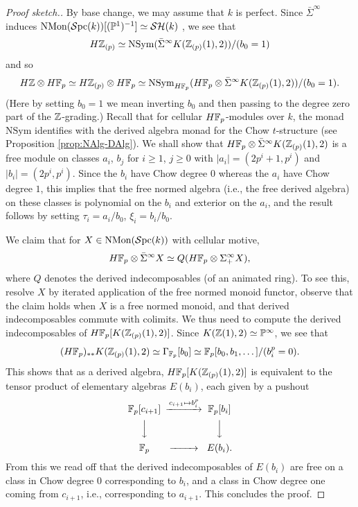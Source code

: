 \documentclass{amsart}
\numberwithin{proposition}{section}
\numberwithin{equation}{section}
\def\NSym{\mathrm{NSym}}
\def\NMon{\mathrm{NMon}}
\begin{document}
\begin{proof}[Proof sketch.]
By base change, we may assume that $k$ is perfect.
Since $\bar\Sigma^\infty$ induces $\NMon(\Spc(k))[(\P^1)^{-1}] \wequi \SH(k)$ \cite[Theorem~1.1]{bachmann-MGM}, we see that \[ H\Z_{(p)} \wequi \NSym(\bar\Sigma^\infty K(\Z_{(p)}(1),2))/(b_0=1) \] and so \[ H\Z \otimes H\F_p \wequi H\Z_{(p)} \otimes H\F_p \wequi \NSym_{H\F_p}(H\F_p \otimes \bar\Sigma^\infty K(\Z_{(p)}(1),2))/(b_0=1). \]
(Here by setting $b_0=1$ we mean inverting $b_0$ and then passing to the degree zero part of the $\mathbb{Z}$-grading.)
Recall that for cellular $H\mathbb{F}_p$-modules over $k$, the monad $\NSym$ identifies with the derived algebra monad for the Chow $t$-structure (see Proposition \ref{prop:NAlg-DAlg}).
We shall show that $H\mathbb{F}_p \otimes \bar\Sigma^\infty K(\mathbb{Z}_{(p)}(1),2)$ is a free module on classes $a_i$, $b_j$ for $i \ge 1$, $j \ge 0$ with $|a_i| = (2p^i+1,p^i)$ and $|b_i| = (2p^i,p^i)$.
Since the $b_i$ have Chow degree $0$ whereas the $a_i$ have Chow degree $1$, this implies that the free normed algebra (i.e., the free derived algebra) on these classes is polynomial on the $b_i$ and exterior on the $a_i$, and the result follows by setting $\tau_i = a_i/b_0$, $\xi_i = b_i/b_0$.

We claim that for $X \in \NMon(\Spc(k))$ with cellular motive, \[ H\mathbb{F}_p \otimes \bar\Sigma^\infty X \simeq Q(H\mathbb{F}_p \otimes \Sigma^\infty_+ X), \] where $Q$ denotes the derived indecomposables (of an animated ring).
To see this, resolve $X$ by iterated application of the free normed monoid functor, observe that the claim holds when $X$ is a free normed monoid, and that derived indecomposables commute with colimits.
We thus need to compute the derived indecomposables of $H\mathbb{F}_p[K(\mathbb{Z}_{(p)}(1),2)]$.
Since $K(\mathbb{Z}(1),2) \simeq \mathbb P^\infty$, we see that \[ (H\mathbb{F}_p)_{**} K(\mathbb{Z}_{(p)}(1),2) \simeq \Gamma_{\mathbb{F}_p}[b_0] \simeq \mathbb{F}_p[b_0, b_1, \dots]/(b_i^p = 0). \]
This shows that as a derived algebra, $H\mathbb{F}_p[K(\mathbb{Z}_{(p)}(1),2)]$ is equivalent to the tensor product of elementary algebras $E(b_i)$, each given by a pushout
\begin{equation*}
\begin{CD}
\F_p[c_{i+1}] @>{c_{i+1} \mapsto b_i^p}>> \F_p[b_i] \\
@VVV  @VVV \\
\F_p @>>> E(b_i).
\end{CD}
\end{equation*}
From this we read off that the derived indecomposables of $E(b_i)$ are free on a class in Chow degree $0$ corresponding to $b_i$, and a class in Chow degree one coming from $c_{i+1}$, i.e., corresponding to $a_{i+1}$.
This concludes the proof.
\end{proof}
\end{document}

